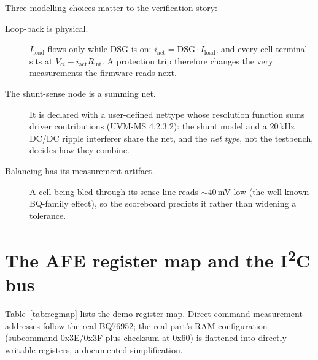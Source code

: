 \documentclass[11pt]{article}
\newcommand{\iic}{I\textsuperscript{2}C}
\begin{document}
Three modelling choices matter to the verification story:

\begin{description}
  \item[Loop-back is physical.]  $I_{\mathrm{load}}$ flows only while
    DSG is on: $i_{\mathrm{act}} = \mathrm{DSG} \cdot
    I_{\mathrm{load}}$, and every cell terminal sits at
    $V_{ci} - i_{\mathrm{act}} R_{\mathrm{int}}$.  A protection trip
    therefore changes the very measurements the firmware reads next.
  \item[The shunt-sense node is a summing net.]  It is declared with a
    user-defined nettype whose resolution function sums driver
    contributions (UVM-MS 4.2.3.2): the shunt model and a 20\,kHz
    DC/DC ripple interferer share the net, and the \emph{net type},
    not the testbench, decides how they combine.
  \item[Balancing has its measurement artifact.]  A cell being bled
    through its sense line reads ${\sim}40$\,mV low (the well-known
    BQ-family effect), so the scoreboard predicts it rather than
    widening a tolerance.
\end{description}

\section{The AFE register map and the \iic{} bus}

Table~\ref{tab:regmap} lists the demo register map.  Direct-command
measurement addresses follow the real BQ76952; the real part's RAM
configuration (subcommand 0x3E/0x3F plus checksum at 0x60) is
flattened into directly writable registers, a documented
simplification.
\end{document}
